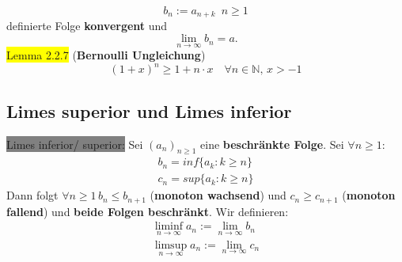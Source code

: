 \documentclass[landscape, 10pt]{article}
\newcommand{\N}{\mathbb{N}}
\begin{document}
\begin{multicols}{3}
\begin{equation*}
                            b_n:=a_{n+k}\enspace n\geqslant1
                     \end{equation*} 
                     definierte Folge \textbf{konvergent} und 
                     \begin{equation*}
                            \lim\limits_{n\to\infty}b_n=a.
                     \end{equation*}
              \colorbox{yellow}{Lemma 2.2.7} 
              (\textbf{Bernoulli Ungleichung}) 
                     \begin{equation*}
                            (1+x)^n\geqslant 1+n\cdot x \quad\forall n\in\N,\, x>-1
                     \end{equation*}
       \subsection{Limes superior und Limes inferior}
              \colorbox{gray}{Limes inferior/ superior:} 
                     Sei \textcolor{NavyBlue}{$(a_n)_{n\geqslant 1}$}
                     eine \textbf{beschränkte Folge}. Sei 
                     \textcolor{NavyBlue}{
                     $\forall n\geqslant1$}:
                     \begin{align*}
                            b_n=inf\{a_k:k\geqslant n\}\\
                            c_n=sup\{a_k:k\geqslant n\}
                     \end{align*}
                     Dann folgt 
                     \textcolor{NavyBlue}{
                     $\forall n\geqslant1\,b_n\leqslant b_{n+1}$} 
                     (\textbf{monoton wachsend}) und 
                     \textcolor{NavyBlue}{
                     $c_n\geqslant c_{n+1}$} 
                     (\textbf{monoton fallend}) 
                     und \textbf{beide Folgen beschränkt}. 
                     Wir definieren: 
                     \begin{align*}
                            \liminf\limits_{n\to\infty}a_n
                            :=\lim\limits_{n\to\infty}b_n\\
                            \limsup\limits_{n\to\infty}a_n
                            :=\lim\limits_{n\to\infty}c_n
                     \end{align*}

\end{multicols}
\end{document}
